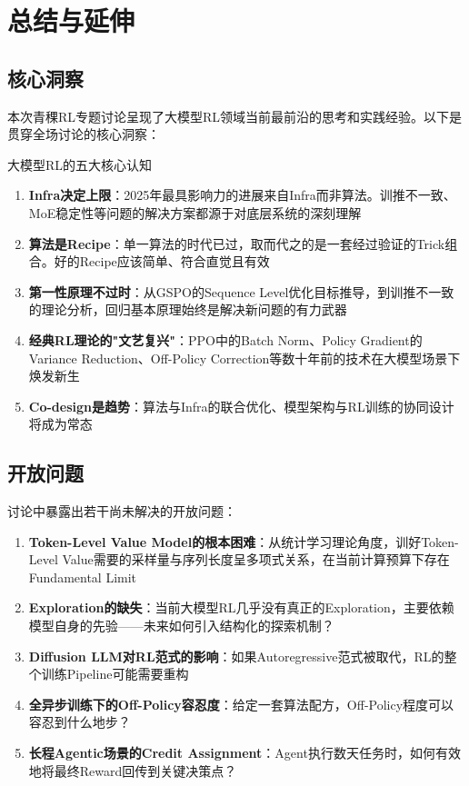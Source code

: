\section{总结与延伸}

\subsection{核心洞察}

本次青稞RL专题讨论呈现了大模型RL领域当前最前沿的思考和实践经验。以下是贯穿全场讨论的核心洞察：

\begin{importantbox}{大模型RL的五大核心认知}
\begin{enumerate}
    \item \textbf{Infra决定上限}：2025年最具影响力的进展来自Infra而非算法。训推不一致、MoE稳定性等问题的解决方案都源于对底层系统的深刻理解
    \item \textbf{算法是Recipe}：单一算法的时代已过，取而代之的是一套经过验证的Trick组合。好的Recipe应该简单、符合直觉且有效
    \item \textbf{第一性原理不过时}：从GSPO的Sequence Level优化目标推导，到训推不一致的理论分析，回归基本原理始终是解决新问题的有力武器
    \item \textbf{经典RL理论的"文艺复兴"}：PPO中的Batch Norm、Policy Gradient的Variance Reduction、Off-Policy Correction等数十年前的技术在大模型场景下焕发新生
    \item \textbf{Co-design是趋势}：算法与Infra的联合优化、模型架构与RL训练的协同设计将成为常态
\end{enumerate}
\end{importantbox}

\subsection{开放问题}

讨论中暴露出若干尚未解决的开放问题：

\begin{enumerate}
    \item \textbf{Token-Level Value Model的根本困难}：从统计学习理论角度，训好Token-Level Value需要的采样量与序列长度呈多项式关系，在当前计算预算下存在Fundamental Limit
    \item \textbf{Exploration的缺失}：当前大模型RL几乎没有真正的Exploration，主要依赖模型自身的先验——未来如何引入结构化的探索机制？
    \item \textbf{Diffusion LLM对RL范式的影响}：如果Autoregressive范式被取代，RL的整个训练Pipeline可能需要重构
    \item \textbf{全异步训练下的Off-Policy容忍度}：给定一套算法配方，Off-Policy程度可以容忍到什么地步？
    \item \textbf{长程Agentic场景的Credit Assignment}：Agent执行数天任务时，如何有效地将最终Reward回传到关键决策点？
\end{enumerate}

